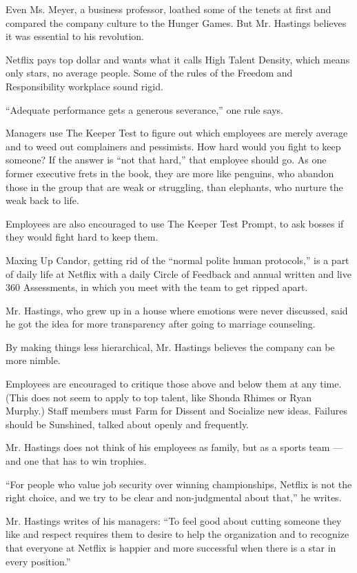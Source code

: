 Even Ms. Meyer, a business professor, loathed some of the tenets at
first and compared the company culture to the Hunger Games. But Mr.
Hastings believes it was essential to his revolution.

Netflix pays top dollar and wants what it calls High Talent Density,
which means only stars, no average people. Some of the rules of the
Freedom and Responsibility workplace sound rigid.

``Adequate performance gets a generous severance,'' one rule says.

Managers use The Keeper Test to figure out which employees are merely
average and to weed out complainers and pessimists. How hard would you
fight to keep someone? If the answer is ``not that hard,'' that employee
should go. As one former executive frets in the book, they are more like
penguins, who abandon those in the group that are weak or struggling,
than elephants, who nurture the weak back to life.

Employees are also encouraged to use The Keeper Test Prompt, to ask
bosses if they would fight hard to keep them.

Maxing Up Candor, getting rid of the ``normal polite human protocols,''
is a part of daily life at Netflix with a daily Circle of Feedback and
annual written and live 360 Assessments, in which you meet with the team
to get ripped apart.

Mr. Hastings, who grew up in a house where emotions were never
discussed, said he got the idea for more transparency after going to
marriage counseling.

By making things less hierarchical, Mr. Hastings believes the company
can be more nimble.

Employees are encouraged to critique those above and below them at any
time. (This does not seem to apply to top talent, like Shonda Rhimes or
Ryan Murphy.) Staff members must Farm for Dissent and Socialize new
ideas. Failures should be Sunshined, talked about openly and frequently.

Mr. Hastings does not think of his employees as family, but as a sports
team --- and one that has to win trophies.

``For people who value job security over winning championships, Netflix
is not the right choice, and we try to be clear and non-judgmental about
that,'' he writes.

Mr. Hastings writes of his managers: ``To feel good about cutting
someone they like and respect requires them to desire to help the
organization and to recognize that everyone at Netflix is happier and
more successful when there is a star in every position.''

